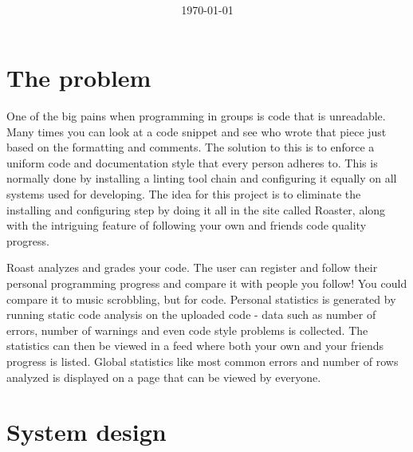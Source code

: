 \documentclass[12pt,a4paper]{report}
\title{
    \coursecode{} \\
    \coursename{} \\
    \vspace{1.8em}
    \textbf{\projectname{}} \break
    \author{
        \authorsinfo{}
    } \break{}
    \schoolinfo{}}
\date{\today}
\begin{document}
\maketitle
\thispagestyle{empty} %
\newpage

{\hypersetup{linkcolor=black}
    \tableofcontents}
\newpage

\chapter{The problem}
One of the big pains when programming in groups is code that is unreadable. Many times you can look at a code snippet and see who wrote that piece
just based on the formatting and comments. The solution to this is to enforce a uniform code and documentation style that every person adheres to.
This is normally done by installing a linting tool chain and configuring it equally on all systems used for developing. 
The idea for this project is to eliminate the installing and configuring step by doing it all in the site called Roaster, along with the intriguing feature of following your own and friends code quality progress.

Roast analyzes and grades your code. The user can register and follow their personal programming progress and compare it with people you follow! 
You could compare it to music scrobbling, but for code.
Personal statistics is generated by running static code analysis on the uploaded code - data such as number of errors, number of warnings and even code style problems is collected.
The statistics can then be viewed in a feed where both your own and your friends progress is listed.
Global statistics like most common errors and number of rows analyzed is displayed on a page that can be viewed by everyone.

\chapter{System design}
\end{document}
